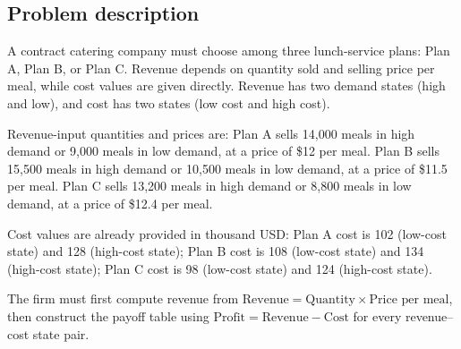 \begin{ExamProblems}
		\item
		\subsection*{Problem description}
		A contract catering company must choose among three lunch-service plans: Plan A, Plan B, or Plan C.
		Revenue depends on quantity sold and selling price per meal, while cost values are given directly.
		Revenue has two demand states (high and low), and cost has two states (low cost and high cost).
		
		Revenue-input quantities and prices are:
		Plan A sells 14{,}000 meals in high demand or 9{,}000 meals in low demand, at a price of \$12 per meal.
		Plan B sells 15{,}500 meals in high demand or 10{,}500 meals in low demand, at a price of \$11.5 per meal.
		Plan C sells 13{,}200 meals in high demand or 8{,}800 meals in low demand, at a price of \$12.4 per meal.
		
		Cost values are already provided in thousand USD:
		Plan A cost is 102 (low-cost state) and 128 (high-cost state);
		Plan B cost is 108 (low-cost state) and 134 (high-cost state);
		Plan C cost is 98 (low-cost state) and 124 (high-cost state).
		
		The firm must first compute revenue from
		\(\text{Revenue}=\text{Quantity}\times\text{Price per meal}\), then construct the payoff table using
		\(\text{Profit}=\text{Revenue}-\text{Cost}\) for every revenue--cost state pair.

\end{ExamProblems}
